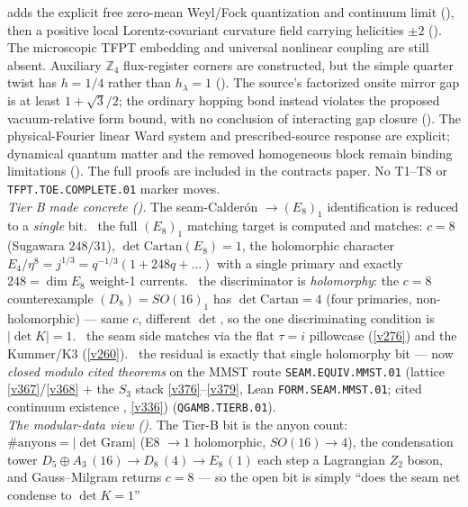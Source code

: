 \documentclass[11pt,a4paper]{article}
\newcommand{\Z}{\mathbb{Z}}
\begin{document}
\begin{keybox}
adds the explicit free zero-mean Weyl/Fock quantization and continuum limit
(), then a positive local
Lorentz-covariant curvature field carrying helicities $\pm2$
(). The microscopic TFPT embedding
and universal nonlinear coupling are still absent. Auxiliary $\Z_4$
flux-register corners are constructed, but the simple quarter twist has
$h=1/4$ rather than $h_\lambda=1$
(). The source's factorized onsite
mirror gap is at least $1+\sqrt3/2$; the ordinary hopping bond instead
violates the proposed vacuum-relative form bound, with no conclusion of
interacting gap closure ().
The physical-Fourier linear Ward system and prescribed-source response
are explicit; dynamical quantum matter and the removed homogeneous
block remain binding limitations ().
The full proofs are included in the contracts paper. No T1--T8 or
\texttt{TFPT.TOE.COMPLETE.01} marker moves.
\smallskip\\
\noindent\emph{Tier B made concrete ().} The
seam-Calder\'on $\to(E_8)_1$ identification is reduced to a \emph{single} bit. \mE\ the full $(E_8)_1$ matching
target is computed and matches: $c{=}8$ (Sugawara $248/31$), $\det\mathrm{Cartan}(E_8){=}1$, the holomorphic
character $E_4/\eta^8{=}j^{1/3}{=}q^{-1/3}(1{+}248q{+}\dots)$ with a single primary and exactly $248{=}\dim E_8$
weight-1 currents. \mE\ the discriminator is \emph{holomorphy}: the $c{=}8$ counterexample
$(D_8){=}SO(16)_1$ has $\det\mathrm{Cartan}{=}4$ (four primaries, non-holomorphic) --- same $c$, different
$\det$, so the one discriminating condition is $|\det K|{=}1$. \mC\ the seam side matches via the flat
$\tau{=}i$ pillowcase (\vref{v276}) and the Kummer/K3 (\vref{v260}). \mC\ the residual is exactly that single
holomorphy bit --- now \emph{closed modulo cited theorems} on the MMST route \texttt{SEAM.EQUIV.MMST.01}
(lattice \vref{v367}/\vref{v368} $+$ the $S_3$ stack
\vref{v376}--\vref{v379}, Lean \texttt{FORM.SEAM.MMST.01}; cited continuum existence \mO, \vref{v336})
(\texttt{QGAMB.TIERB.01}).
\smallskip\\
\noindent\emph{The modular-data view ().} The Tier-B bit is the
anyon count: $\#\text{anyons}=|\det\mathrm{Gram}|$ (E8 $\to1$ holomorphic, $SO(16)\to4$), the
condensation tower $D_5{\oplus}A_3\,(16)\to D_8\,(4)\to E_8\,(1)$ each step a Lagrangian $Z_2$ boson, and
Gauss--Milgram returns $c{=}8$ --- so the open bit is simply ``does the seam net condense to $\det K{=}1$''

\end{keybox}
\end{document}
